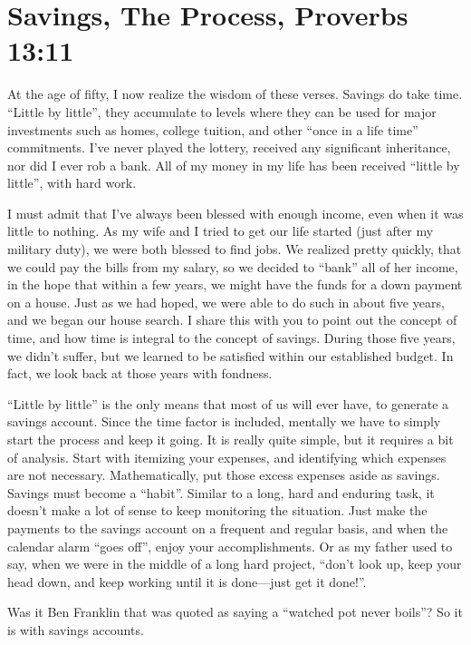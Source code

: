 \documentclass[12pt]{memoir}
\begin{document}
\section{Savings, The Process, Proverbs 13:11}

At the age of fifty, I now realize the wisdom of these verses. Savings
do take time. ``Little by little'', they accumulate to levels where
they can be used for major investments such as homes, college tuition,
and other ``once in a life time'' commitments. I've never played
the lottery, received any significant inheritance, nor did I ever
rob a bank. All of my money in my life has been received ``little
by little'', with hard work. 

I must admit that I've always been blessed with enough income, even
when it was little to nothing. As my wife and I tried to get our life
started (just after my military duty), we were both blessed to find
jobs. We realized pretty quickly, that we could pay the bills from
my salary, so we decided to ``bank'' all of her income, in the hope
that within a few years, we might have the funds for a down payment
on a house. Just as we had hoped, we were able to do such in about
five years, and we began our house search. I share this with you to
point out the concept of time, and how time is integral to the concept
of savings. During those five years, we didn't suffer, but we learned
to be satisfied within our established budget. In fact, we look back
at those years with fondness. 

``Little by little'' is the only means that most of us will ever
have, to generate a savings account. Since the time factor is included,
mentally we have to simply start the process and keep it going. It
is really quite simple, but it requires a bit of analysis. Start with
itemizing your expenses, and identifying which expenses are not necessary.
Mathematically, put those excess expenses aside as savings. Savings
must become a ``habit''. Similar to a long, hard and enduring task,
it doesn't make a lot of sense to keep monitoring the situation. Just
make the payments to the savings account on a frequent and regular
basis, and when the calendar alarm ``goes off'', enjoy your accomplishments.
Or as my father used to say, when we were in the middle of a long
hard project, ``don't look up, keep your head down, and keep working
until it is done---just get it done!''. 

Was it Ben Franklin that was quoted as saying a ``watched pot never
boils''? So it is with savings accounts.
\end{document}
